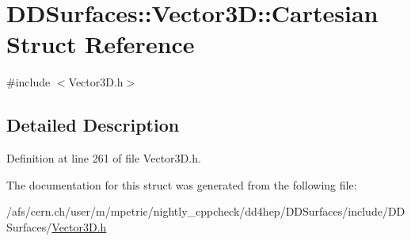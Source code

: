 \hypertarget{struct_d_d_surfaces_1_1_vector3_d_1_1_cartesian}{}\section{D\+D\+Surfaces\+:\+:Vector3D\+:\+:Cartesian Struct Reference}
\label{struct_d_d_surfaces_1_1_vector3_d_1_1_cartesian}


{\ttfamily \#include $<$Vector3\+D.\+h$>$}



\subsection{Detailed Description}


Definition at line 261 of file Vector3\+D.\+h.



The documentation for this struct was generated from the following file\+:\begin{DoxyCompactItemize}
\item 
/afs/cern.\+ch/user/m/mpetric/nightly\+\_\+cppcheck/dd4hep/\+D\+D\+Surfaces/include/\+D\+D\+Surfaces/\hyperlink{_vector3_d_8h}{Vector3\+D.\+h}\end{DoxyCompactItemize}
